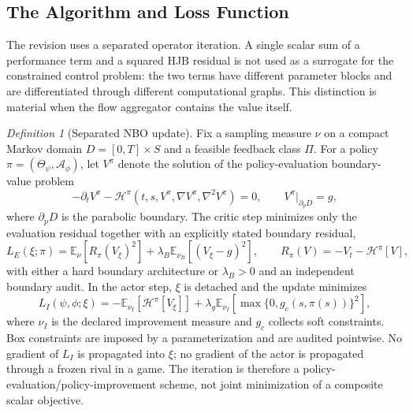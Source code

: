 \documentclass[ecta]{econsocart}
\theoremstyle{plain}
\theoremstyle{remark}
\newtheorem{definition}{Definition}
\newcommand{\E}{\mathbb{E}}
\begin{document}
\subsection{The Algorithm and Loss Function}
The revision uses a separated operator iteration. A single scalar sum of a performance term and a squared HJB residual is not used as a surrogate for the constrained control problem: the two terms have different parameter blocks and are differentiated through different computational graphs. This distinction is material when the flow aggregator contains the value itself.

\begin{definition}[Separated NBO update]
Fix a sampling measure $\nu$ on a compact Markov domain $D=[0,T]\times S$ and a feasible feedback class $\Pi$. For a policy $\pi=(\Theta_\psi,\mathcal A_\phi)$, let $V^{\pi}$ denote the solution of the policy-evaluation boundary-value problem
\begin{equation}
-\partial_t V^{\pi}-\mathcal H^{\pi}(t,s,V^{\pi},\nabla V^{\pi},\nabla^2V^{\pi})=0,
\qquad V^{\pi}|_{\partial_pD}=g,
\label{eq:r2_policy_eval}
\end{equation}
where $\partial_pD$ is the parabolic boundary. The critic step minimizes only the evaluation residual together with an explicitly stated boundary residual,
\begin{equation}
L_E(\xi;\pi)=\E_\nu[R_\pi(V_\xi)^2]+\lambda_B\E_{\nu_B}[(V_\xi-g)^2],
\qquad R_\pi(V)=-V_t-\mathcal H^\pi[V],
\label{eq:r2_eval_loss}
\end{equation}
with either a hard boundary architecture or $\lambda_B>0$ and an independent boundary audit. In the actor step, $\xi$ is detached and the update minimizes
\begin{equation}
L_I(\psi,\phi;\xi)=-\E_{\nu_I}\left[\mathcal H^{\pi}[V_\xi]\right]+\lambda_g\E_{\nu_I}[\max\{0,g_c(s,\pi(s))\}^2],
\label{eq:r2_improvement_loss}
\end{equation}
where $\nu_I$ is the declared improvement measure and $g_c$ collects soft constraints. Box constraints are imposed by a parameterization and are audited pointwise. No gradient of $L_I$ is propagated into $\xi$; no gradient of the actor is propagated through a frozen rival in a game. The iteration is therefore a policy-evaluation/policy-improvement scheme, not joint minimization of a composite scalar objective.
\end{definition}
\end{document}

